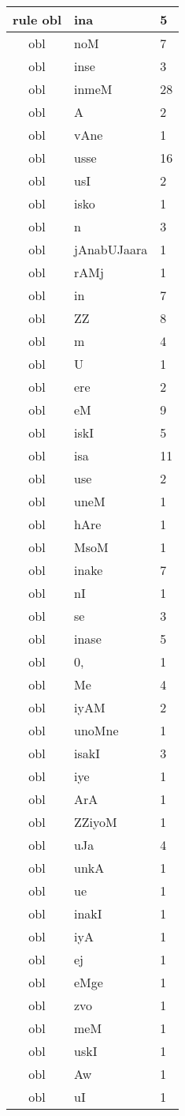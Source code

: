 \documentclass[a4 paper]{article}
\begin{document}
\begin{longtable}{cp{}p{}}
rule obl & ina & 5\\ \midrule obl & noM & 7\\ \midrule obl & inse & 3\\ \midrule obl & inmeM & 28\\ \midrule obl & A & 2\\ \midrule obl & vAne & 1\\ \midrule obl & usse & 16\\ \midrule obl & usI & 2\\ \midrule obl & isko & 1\\ \midrule obl & n & 3\\ \midrule obl & jAnabUJaara & 1\\ \midrule obl & rAMj & 1\\ \midrule obl & in & 7\\ \midrule obl & ZZ & 8\\ \midrule obl & m & 4\\ \midrule obl & U & 1\\ \midrule obl & ere & 2\\ \midrule obl & eM & 9\\ \midrule obl & iskI & 5\\ \midrule obl & isa & 11\\ \midrule obl & use & 2\\ \midrule obl & uneM & 1\\ \midrule obl & hAre & 1\\ \midrule obl & MsoM & 1\\ \midrule obl & inake & 7\\ \midrule obl & nI & 1\\ \midrule obl & se & 3\\ \midrule obl & inase & 5\\ \midrule obl & 0, & 1\\ \midrule obl & Me & 4\\ \midrule obl & iyAM & 2\\ \midrule obl & unoMne & 1\\ \midrule obl & isakI & 3\\ \midrule obl & iye & 1\\ \midrule obl & ArA & 1\\ \midrule obl & ZZiyoM & 1\\ \midrule obl & uJa & 4\\ \midrule obl & unkA & 1\\ \midrule obl & ue & 1\\ \midrule obl & inakI & 1\\ \midrule obl & iyA & 1\\ \midrule obl & ej & 1\\ \midrule obl & eMge & 1\\ \midrule obl & zvo & 1\\ \midrule obl & meM & 1\\ \midrule obl & uskI & 1\\ \midrule obl & Aw & 1\\ \midrule obl & uI & 1\\ \midrule 

\end{longtable}
\end{document}
